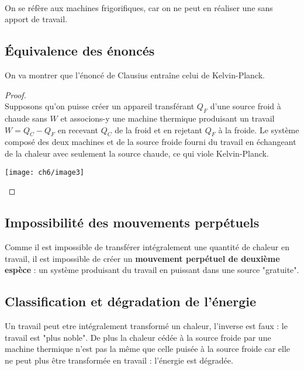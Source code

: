 	\ \\
	On se réfère aux machines frigorifiques, car on ne peut en 
	réaliser une sans apport de travail.
	
		\subsection{Équivalence des énoncés} 
		On va montrer que l'énoncé de Clausius entraîne celui de 
		Kelvin-Planck.
		
		\begin{proof}\ \\
		Supposons qu'on puisse créer un appareil transférant $Q_F$ 
		d'une source froid à chaude sans $W$ et associons-y une 
		machine thermique produisant un travail $W=Q_C-Q_F$ en 
		recevant $Q_C$ de la froid et en rejetant $Q_F$ à la froide. 
		Le système composé des deux machines et de la source 
		froide fourni du travail en échangeant de la chaleur avec 
		seulement la source chaude, ce qui viole Kelvin-Planck.
		
		\begin{center}
		\texttt{[image: ch6/image3]}
		\end{center}
		\end{proof}
		
		\subsection{Impossibilité des mouvements perpétuels}
		Comme il est impossible de transférer intégralement une 
		quantité de chaleur en travail, il est impossible de créer 
		un \textbf{mouvement perpétuel de deuxième espèce} : un 
		système produisant du travail en puissant dans une source 
		"gratuite".
		
		\subsection{Classification et dégradation de l'énergie}
		Un travail peut etre intégralement transformé un chaleur, 
		l'inverse est faux : le travail est "plus noble". De plus 
		la chaleur cédée à la source froide par une machine 
		thermique n'est pas la même que celle puisée à la source 
		froide car elle ne peut plus être transformée en travail : 
		l'énergie est dégradée.


